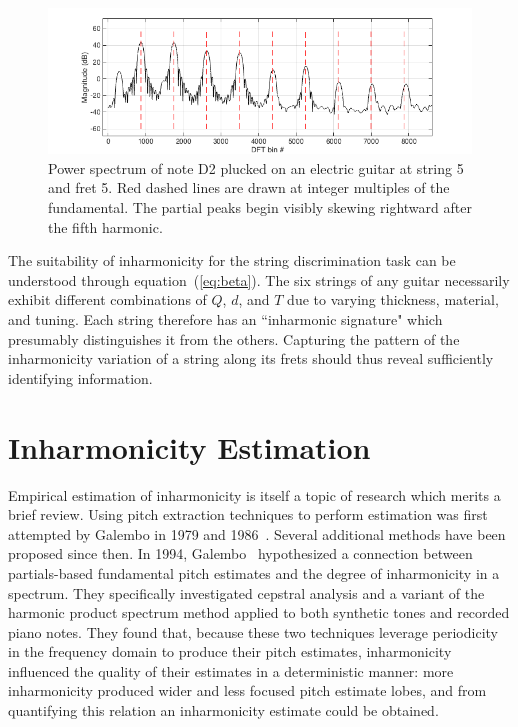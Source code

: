 \documentclass[12pt]{cmuthesis}
\begin{document}
\begin{figure}[!htbp]
\centering
\includegraphics[scale=0.65]{skew}
\caption{Power spectrum of note D2 plucked on an electric guitar at string 5 and fret 5. Red dashed lines are drawn at integer multiples of the fundamental. The partial peaks begin visibly skewing rightward after the fifth harmonic.}
\label{fig:skew}
\end{figure}

The suitability of inharmonicity for the string discrimination task can be understood through equation~(\ref{eq:beta}). The six strings of any guitar necessarily exhibit different combinations of $Q$, $d$, and $T$ due to varying thickness, material, and tuning. Each string therefore has an ``inharmonic signature" which presumably distinguishes it from the others. Capturing the pattern of the inharmonicity variation of a string along its frets should thus reveal sufficiently identifying information.

\section{Inharmonicity Estimation}
\label{lit-beta-est}
Empirical estimation of inharmonicity is itself a topic of research which merits a brief review. Using pitch extraction techniques to perform estimation was first attempted by Galembo in 1979 and 1986~\cite{galembo1979,galembo1987}. Several additional methods have been proposed since then. In 1994, Galembo~\cite{galembo1994} hypothesized a connection between partials-based fundamental pitch estimates and the degree of inharmonicity in a spectrum. They specifically investigated cepstral analysis and a variant of the harmonic product spectrum method applied to both synthetic tones and recorded piano notes. They found that, because these two techniques leverage periodicity in the frequency domain to produce their pitch estimates, inharmonicity influenced the quality of their estimates in a deterministic manner: more inharmonicity produced wider and less focused pitch estimate lobes, and from quantifying this relation an inharmonicity estimate could be obtained.
 
\end{document}

